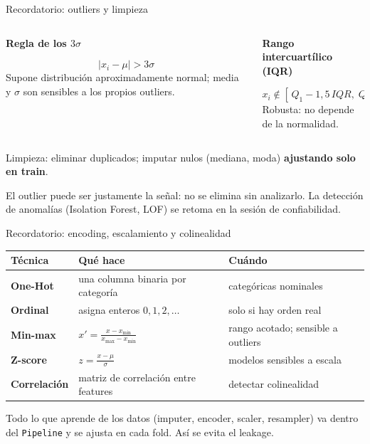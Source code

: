 \documentclass[aspectratio=169,12pt]{beamer}
\newcommand{\colhead}[1]{\textbf{#1}\par\vspace{2pt}}
\newcommand{\hrow}{\rowcolor{mlcream}}
\begin{document}
\begin{frame}{Recordatorio: outliers y limpieza}
  \begin{columns}[T]
    \begin{column}{0.47\textwidth}
      \colhead{Regla de los $3\sigma$}
      \[ |x_i - \mu| > 3\sigma \]
      \small Supone distribución aproximadamente normal; media y $\sigma$ son sensibles a los propios outliers.
    \end{column}
    \begin{column}{0.47\textwidth}
      \colhead{Rango intercuartílico (IQR)}
      \[ x_i \notin [\,Q_1 - 1{,}5\,IQR,\; Q_3 + 1{,}5\,IQR\,] \]
      \small Robusta: no depende de la normalidad.
    \end{column}
  \end{columns}
  \vspace{4pt}
  \small Limpieza: eliminar duplicados; imputar nulos (mediana, moda) \textbf{ajustando solo en train}.
  \begin{rulebox}[En fraude]
    El outlier puede ser justamente la señal: no se elimina sin analizarlo. La detección de anomalías (Isolation Forest, LOF) se retoma en la sesión de confiabilidad.
  \end{rulebox}
\end{frame}

\begin{frame}{Recordatorio: encoding, escalamiento y colinealidad}
  \centering\footnotesize
  \begin{tabular}{@{}l L{0.40\textwidth} L{0.38\textwidth}@{}}
    \toprule
    \hrow \textbf{Técnica} & Qué hace & Cuándo \\
    \midrule
    \textbf{One-Hot} & una columna binaria por categoría & categóricas nominales \\
    \textbf{Ordinal} & asigna enteros $0, 1, 2, \ldots$ & solo si hay orden real \\
    \textbf{Min-max} & $x' = \frac{x - x_{\min}}{x_{\max} - x_{\min}}$ & rango acotado; sensible a outliers \\
    \textbf{Z-score} & $z = \frac{x - \mu}{\sigma}$ & modelos sensibles a escala \\
    \textbf{Correlación} & matriz de correlación entre features & detectar colinealidad \\
    \bottomrule
  \end{tabular}
  \vspace{6pt}
  \raggedright
  \begin{keybox}
    Todo lo que aprende de los datos (imputer, encoder, scaler, resampler) va dentro del \texttt{Pipeline} y se ajusta en cada fold. Así se evita el leakage.
  \end{keybox}
\end{frame}
\end{document}
